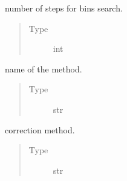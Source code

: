 \documentclass[letterpaper,10pt,english]{sphinxmanual}
\begin{document}
\begin{fulllineitems}

\begin{fulllineitems}
\label{\detokenize{_modules/cosifer.inferencers:cosifer.inferencers.funchisq.FunChisq.k_step}}
number of steps for bins search.
\begin{quote}\begin{description}
\item[{Type}] \leavevmode
int

\end{description}\end{quote}

\end{fulllineitems}


\begin{fulllineitems}
\label{\detokenize{_modules/cosifer.inferencers:cosifer.inferencers.funchisq.FunChisq.method}}
name of the method.
\begin{quote}\begin{description}
\item[{Type}] \leavevmode
str

\end{description}\end{quote}

\end{fulllineitems}


\begin{fulllineitems}
\label{\detokenize{_modules/cosifer.inferencers:cosifer.inferencers.funchisq.FunChisq.correction}}
correction method.
\begin{quote}\begin{description}
\item[{Type}] \leavevmode
str

\end{description}\end{quote}


\end{fulllineitems}
\end{fulllineitems}
\end{document}
